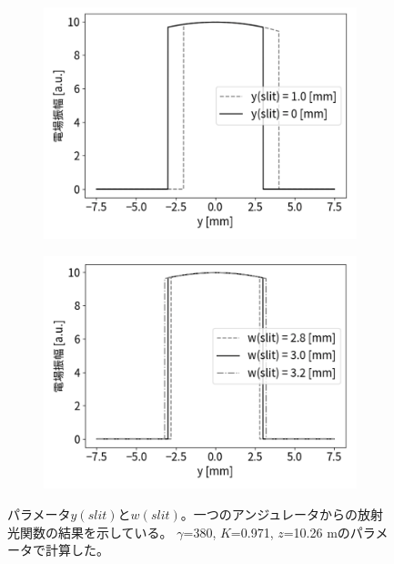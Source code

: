 \documentclass[a4paper,11pt,uplatex]{jsbook}
\begin{document}
\begin{figure}[h]
  \begin{subfigure}[h]{0.45\linewidth}
    \centering
    \includegraphics[width = \linewidth]{image/2-yslit.png}
  \end{subfigure}
  \begin{subfigure}[h]{0.45\linewidth}
    \centering
    \includegraphics[width = \linewidth]{image/2-wslit.png}
  \end{subfigure}
  \caption[光学関数のスリット座標]{パラメータ$y(slit)$と$w(slit)$。一つのアンジュレータからの放射光関数の結果を示している。
  $\gamma$=380, $K$=0.971, $z$=10.26 mのパラメータで計算した。}\label{fig:slit}
\end{figure}
\end{document}
